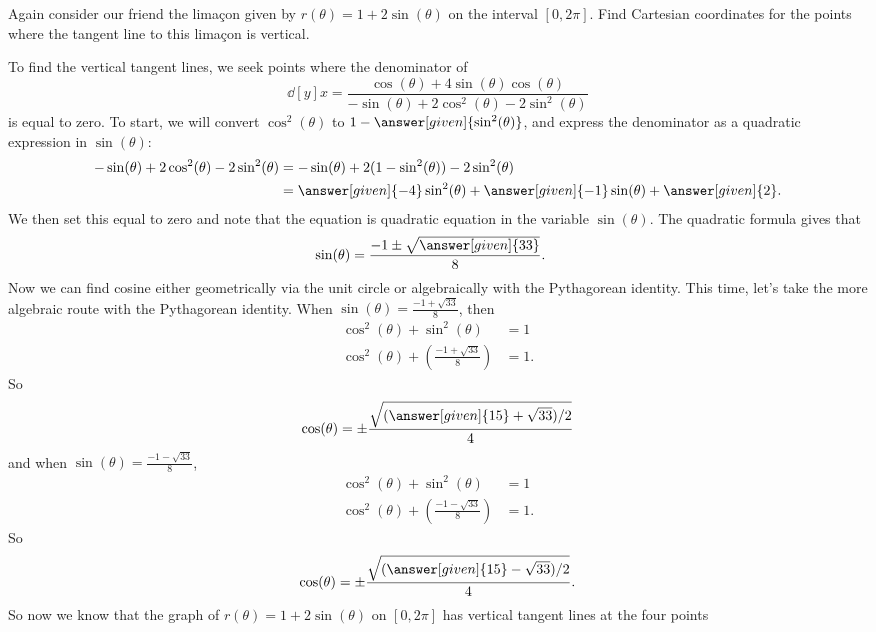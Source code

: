 \documentclass{ximera}
\begin{document}
\begin{example}
  Again consider our friend the lima\c{c}on given by $r(\theta)
  =1+2\sin(\theta)$ on the interval $[0,2\pi]$.  Find Cartesian
  coordinates for the points where the tangent line to this lima\c{c}on
  is vertical.
  \begin{explanation}
    To find the vertical tangent lines, we seek points where the
    denominator of
    \[
    \dd[y]{x}=\frac{\cos(\theta) + 4\sin(\theta)\cos(\theta)}{-\sin(\theta) + 2\cos^2(\theta)-2\sin^2(\theta)}
    \]
    is equal to zero.  To start, we will convert $\cos^2(\theta)$ to
    $1-\answer[given]{\sin^2(\theta)}$, and express the denominator as a quadratic
    expression in $\sin(\theta)$:
  \begin{align*}
    -\sin(\theta) + 2\cos^2(\theta)-2\sin^2(\theta) & = -\sin(\theta) + 2(1-\sin^2(\theta))-2\sin^2(\theta) \\
    &= \answer[given]{-4} \sin^2(\theta) + \answer[given]{-1}\sin(\theta) + \answer[given]{2}.
  \end{align*}
  We then set this equal to zero and note that the equation is quadratic equation in the variable $\sin(\theta)$. The quadratic formula gives that 
  \begin{align*}
    \sin(\theta) &= \frac{-1\pm\sqrt{\answer[given]{33}}}{8}.
  \end{align*}
  Now we can find cosine either geometrically via the unit circle or algebraically with the Pythagorean
  identity.  This time, let's take the more algebraic route with the Pythagorean identity. When $\sin(\theta) =\frac{-1+\sqrt{33}}{8}$, then
  \begin{align*}
    \cos^2(\theta) + \sin^2(\theta) &= 1\\
    \cos^2(\theta) + \left(\frac{-1+\sqrt{33}}{8}\right) &= 1.
  \end{align*}
  So
  \[
  \cos(\theta) = \pm \frac{\sqrt{(\answer[given]{15}+\sqrt{33})/2}}{4}
  \]
  and when $\sin(\theta) =\frac{-1-\sqrt{33}}{8}$,
  \begin{align*}
    \cos^2(\theta) + \sin^2(\theta) &= 1\\
    \cos^2(\theta) + \left(\frac{-1-\sqrt{33}}{8}\right) &= 1.
  \end{align*}
  So
  \[
  \cos(\theta) = \pm \frac{\sqrt{(\answer[given]{15}-\sqrt{33})/2}}{4}.
  \]
  So now we know that the graph of $r(\theta) =1+2\sin(\theta)$ on
  $[0,2\pi]$ has vertical tangent lines at the four points
   \begin{image}
      \begin{tikzpicture}

\end{tikzpicture}
\end{image}
\end{explanation}
\end{example}
\end{document}
